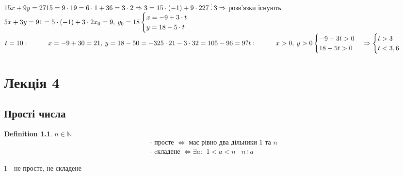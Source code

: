 \documentclass[a4paper,12pt, centered]{bookest}
\newtheorem{definition}{Definition}[section]
\newcommand\tab[1][1cm]{\hspace*{#1}}
\begin{document}
\begin{example}
$15x+9y=27\\ 15=9\cdot 1\\9=6\cdot 1+3\\6=3\cdot 2\Rightarrow3=15\cdot(-1)+9\cdot 2\\27\>\vdots\>3\Rightarrow$ розв'язки існують \\
$5x+3y=9\\1=5\cdot(-1)+3\cdot2\\x_0=9,\>y_0=18\\\begin{cases}
	x=-9+3\cdot t\\y=18-5\cdot t
\end{cases}$ $t=10:\tab x=-9+30=21,\>y=18-50=-32\\5\cdot21-3\cdot32=105-96=9\\?t:\tab x>0,\>y>0\\\begin{cases}
	-9+3t>0\\18-5t>0
	\end{cases}\Rightarrow\begin{cases}
		t>3\\t<3,6
	\end{cases}$
\end{example}
\chapter{Лекція 4}
\section{Прості числа}
\begin{definition}$n\in\mathbb{N}$
\begin{align*}
	\textrm{ - просте }\Leftrightarrow\textrm{ має рівно два дільники 1 та }n\\
	\textrm{ - cкладене }\Leftrightarrow\exists a:\>\>1<a<n\>\>\>\>n\>\vdots\>a
\end{align*}
\end{definition}

1 - не просте, не складене
\end{document}
